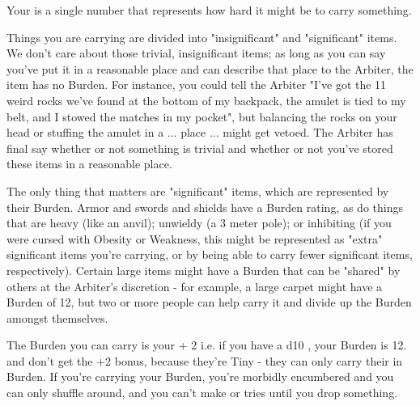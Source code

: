 

  Your  is a single number that represents how hard it might be to carry something. 

  Things you are carrying are divided into "insignificant" and "significant" items. We don't  care about those trivial, insignificant items; as long as you can say you've put it in a reasonable place and can describe that place to the Arbiter, the item has no Burden. For instance, you could tell the Arbiter "I've got the 11 weird rocks we've found at the bottom of my backpack, the amulet is tied to my belt, and I stowed the matches in my pocket", but balancing the rocks on your head or stuffing the amulet in a ... place ... might get vetoed. The Arbiter has final say whether or not something is trivial and whether or not you've stored these items in a reasonable place.

  The only thing that matters are "significant" items, which are represented by their Burden. Armor and swords and shields have a Burden rating, as do things that are heavy (like an anvil); unwieldy (a 3 meter pole); or inhibiting (if you were cursed with Obesity or Weakness, this might be represented as "extra" significant items you're carrying, or by being able to carry fewer significant items, respectively). Certain large items might have a Burden that can be "shared" by others at the Arbiter's discretion - for example, a large carpet might have a Burden of 12, but two or more people can help carry it and divide up the Burden amongst themselves.

  The \MAX Burden you can carry is your \VIG + 2 i.e. if you have a d10 \VIG, your Burden is 12.  and  don't get the +2 bonus, because they're Tiny - they can only carry their \VIG in Burden. If you're carrying your \MAX Burden, you're morbidly encumbered and you can only shuffle around, and you can't make  \RO or \RB tries until you drop something.

